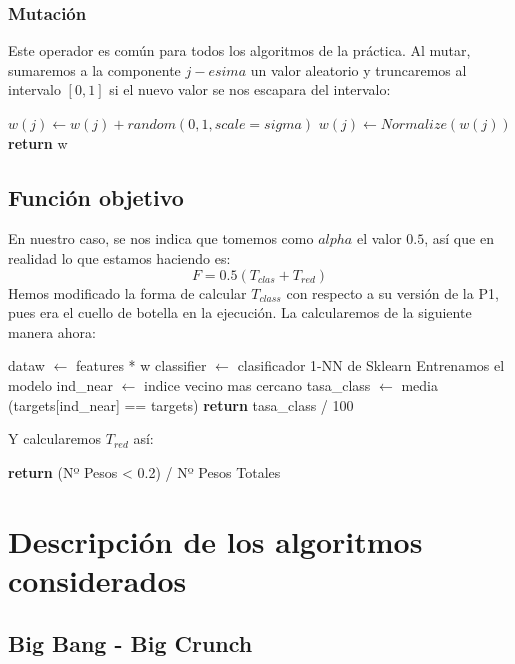\documentclass[10pt, a4paper]{article}
\theoremstyle{theorem-style}
\theoremstyle{theorem-style}
\theoremstyle{theorem2-style}
\theoremstyle{definition-style}
\theoremstyle{remark-style}
\theoremstyle{example-style}
\theoremstyle{definition-style}
\theoremstyle{remark-style}
\theoremstyle{remark-style}
\begin{document}
\subsubsection{\textcolor{ugrColor}{Mutación}}
Este operador es común para todos los algoritmos de la práctica. Al mutar, sumaremos a la componente $j-esima$ un valor aleatorio y truncaremos al intervalo $[0,1]$ si el nuevo valor se nos escapara del intervalo:\\
\begin{algorithmic}[1]
\State $w(j) \gets w(j) + random(0,1, scale = sigma)$
\State $w(j) \gets Normalize(w(j))$
\State \textbf{return} w
\EndProcedure
\end{algorithmic}

\subsection{Función objetivo}
En nuestro caso, se nos indica que tomemos como $alpha$ el valor $0.5$, así que en realidad lo que estamos haciendo es:
\[
F = 0.5(T_{clas} + T_{red})
\]
Hemos modificado la forma de calcular  $T_{class}$ con respecto a su versión de la P1, pues era el cuello de botella en la ejecución. La calcularemos de la siguiente manera ahora:\\

\begin{algorithmic}[1]
\State dataw $\gets$ features * w
\State classifier $\gets$ clasificador 1-NN de Sklearn
\State Entrenamos el modelo
\State ind\_near $\gets$ indice vecino mas cercano
\State tasa\_class $\gets$ media (targets[ind\_near] == targets)
\State \textbf{return} tasa\_class / 100

\EndProcedure
\end{algorithmic}

Y calcularemos $T_{red}$ así:\\
\begin{algorithmic}[1]
\State \textbf{return} (Nº Pesos < 0.2) / Nº Pesos Totales
\EndProcedure
\end{algorithmic}

\section{Descripción de los algoritmos considerados}

\subsection{Big Bang - Big Crunch}
\end{document}
